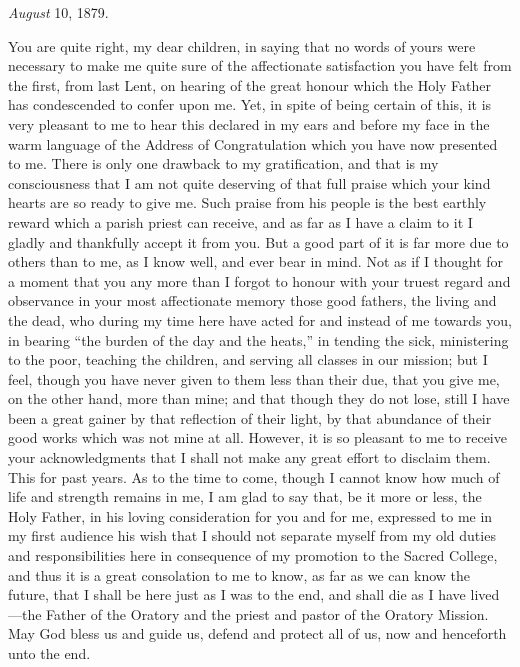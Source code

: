 \emph{August} 10, 1879.

You are quite right, my dear children, in saying that no words of
yours were necessary to make me quite sure of the affectionate
satisfaction you have felt from the first, from last Lent, on hearing
of the great honour which the Holy Father has condescended to confer
upon me. Yet, in spite of being certain of this, it is very pleasant
to me to hear this declared in my ears and before my face in the warm
language of the Address of Congratulation which you have now presented
to me. There is only one drawback to my gratification, and that is my
consciousness that I am not quite deserving of that full praise which
your kind hearts are so ready to give me. Such praise from his
people is the best earthly reward which a parish priest can receive,
and as far as I have a claim to it I gladly and thankfully accept it
from you. But a good part of it is far more due to others than to me,
as I know well, and ever bear in mind. Not as if I thought for a
moment that you any more than I forgot to honour with your truest
regard and observance in your most affectionate memory those good
fathers, the living and the dead, who during my time here have acted
for and instead of me towards you, in bearing ``the burden of the
day and the heats,'' in tending the sick, ministering to the poor,
teaching the children, and serving all classes in our mission; but I
feel, though you have never given to them less than their due, that
you give me, on the other hand, more than mine; and that though they
do not lose, still I have been a great gainer by that reflection of
their light, by that abundance of their good works which was not mine
at all. However, it is so pleasant to me to receive your
acknowledgments that I shall not make any great effort to disclaim
them. This for past years. As to the time to come, though I
cannot know how much of life and strength remains in me, I am glad to
say that, be it more or less, the Holy Father, in his loving
consideration for you and for me, expressed to me in my first audience
his wish that I should not separate myself from my old duties and
responsibilities here in consequence of my promotion to the Sacred
College, and thus it is a great consolation to me to know, as far as
we can know the future, that I shall be here just as I was to the end,
and shall die as I have lived—the Father of the Oratory and the
priest and pastor of the Oratory Mission. May God bless us and guide
us, defend and protect all of us, now and henceforth unto the end.


